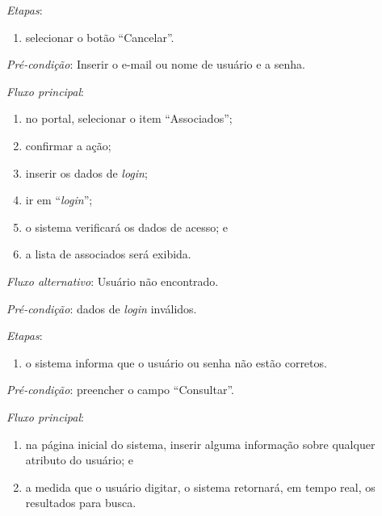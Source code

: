 \noindent \textit{Etapas}:

\begin{enumerate}
    \item selecionar o botão ``Cancelar''.
\end{enumerate}



\vspace{0.7cm}

\noindent \textit{Pré-condição}: Inserir o e-mail ou nome de usuário e a senha.

\noindent \textit{Fluxo principal}:

\begin{enumerate}
    \item no portal, selecionar o item ``Associados'';
    \item confirmar a ação;
    \item inserir os dados de \textit{login};
    \item ir em ``\textit{login}'';
    \item o sistema verificará os dados de acesso; e
    \item a lista de associados será exibida.
\end{enumerate}

\noindent \textit{Fluxo alternativo}: Usuário não encontrado.

\noindent \textit{Pré-condição}: dados de \textit{login} inválidos.

\noindent \textit{Etapas}:

\begin{enumerate}
    \item o sistema informa que o usuário ou senha não estão corretos.
\end{enumerate}



\vspace{0.7cm}

\noindent \textit{Pré-condição}: preencher o campo ``Consultar''.

\noindent \textit{Fluxo principal}:

\begin{enumerate}
    \item na página inicial do sistema, inserir alguma informação sobre qualquer atributo do usuário; e
    \item a medida que o usuário digitar, o sistema retornará, em tempo real, os resultados para busca.
\end{enumerate}

